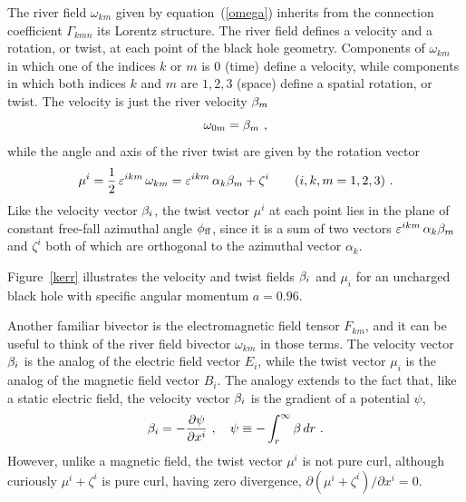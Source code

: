\documentclass[twocolumn,showpacs,preprintnumbers,amsmath,amssymb,prb]{revtex4}
\begin{document}
\kerrfig

The river field $\omega_{km}$
given by equation~(\ref{omega})
inherits from the connection coefficient $\Gamma_{kmn}$
its Lorentz structure.
The river field defines a velocity and a rotation, or twist,
at each point of the black hole geometry.
Components of $\omega_{km}$ in which one of the indices $k$ or $m$ is 0 (time)
define a velocity,
while components in which both indices $k$ and $m$ are $1,2,3$ (space)
define a spatial rotation, or twist.
The velocity is just the river velocity $\beta_m$
\begin{equation}
\label{omegatime}
  \omega_{0m} = \beta_m
  \ ,
\end{equation}
while the angle and axis of the river twist are given by the rotation vector
\begin{equation}
\label{omegaspace}
  \mu^i =
  {1 \over 2} \, \varepsilon^{ikm} \, \omega_{km} =
  \varepsilon^{ikm} \, \alpha_k \beta_m + \zeta^i
  \qquad
  (i,k,m = 1,2,3)
  \ .
\end{equation}
Like the velocity vector $\beta_i$,
the twist vector $\mu^i$ at each point lies in the plane
of constant free-fall azimuthal angle $\phi_{\rm ff}$,
since it is a sum of two vectors
$\varepsilon^{ikm} \, \alpha_k \beta_m$ and $\zeta^i$
both of which are orthogonal to the azimuthal vector $\alpha_k$.


Figure~\ref{kerr}
illustrates the velocity and twist fields
$\beta_i$ and $\mu_i$
for an uncharged black hole with specific angular momentum $a = 0.96$.

Another familiar bivector is the electromagnetic field tensor $F_{km}$,
and it can be useful to think of the river field bivector $\omega_{km}$
in those terms.
The velocity vector $\beta_i$ is the analog of the electric field vector $E_i$,
while the twist vector $\mu_i$ is the analog of the magnetic field vector $B_i$.
The analogy extends to the fact that, like a static electric field,
the velocity vector $\beta_i$ is the gradient of a potential $\psi$,
\begin{equation}
  \beta_i = - {\partial \psi \over \partial x^i}
  \ ,
  \quad
  \psi \equiv - \int_r^\infty \beta \, d r
  \ .
\end{equation}
However, unlike a magnetic field,
the twist vector $\mu^i$ is not pure curl,
although curiously $\mu^i + \zeta^i$ is pure curl,
having zero divergence,
$\partial (\mu^i + \zeta^i ) / \partial x^i = 0$.
\end{document}
